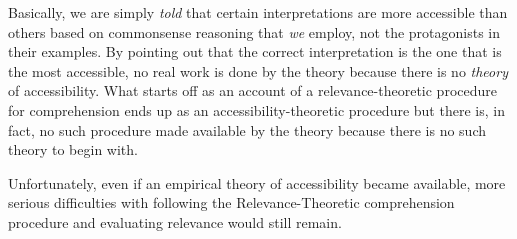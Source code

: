 %
%
%

Basically, we are simply \emph{told} that certain interpretations are more accessible than others based on commonsense reasoning that \emph{we} employ, not the protagonists in their examples. By pointing out that the correct interpretation is the one that is the most accessible, no real work is done by the theory because there is no \emph{theory} of accessibility. What starts off as an account of a relevance-theoretic procedure for comprehension ends up as an accessibility-theoretic procedure but there is, in fact, no such procedure made available by the theory because there is no such theory to begin with. 

Unfortunately, even if an empirical theory of accessibility became available, more serious difficulties with following the Relevance-Theoretic comprehension procedure and evaluating relevance would still remain.



